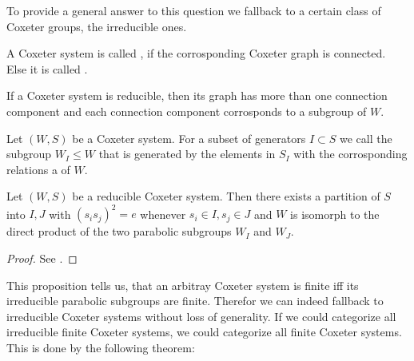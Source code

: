 To provide a general answer to this question we fallback to a certain class of Coxeter groups, the irreducible ones.

\begin{defi}
	\label{irreducible-coxeter-system}
	A Coxeter system is called , if the corrosponding Coxeter graph is connected. Else it is called .
\end{defi}

If a Coxeter system is reducible, then its graph has more than one connection component and each connection component corrosponds to a subgroup of $W$. 

\begin{defi}
	\label{parabolic-subgroup}
	Let $(W,S)$ be a Coxeter system. For a subset of generators $I \subset S$ we call the subgroup $W_I \leq W$ that is generated by the elements in $S_I$ with the corrosponding relations a  of $W$.
\end{defi}

\begin{prop}
	\label{reducible-coxeter-systems-isomorph-to-parabolic-subgroups}
	Let $(W,S)$ be a reducible Coxeter system. Then there exists a partition of $S$ into $I,J$ with $(s_i s_j)^2 = e$ whenever $s_i \in I, s_j \in J$ and $W$ is isomorph to the direct product of the two parabolic subgroups $W_I$ and $W_J$.

	\begin{proof}
		See \cite[Proposition 6.1]{humphreys:coxeter}.
	\end{proof}
\end{prop}

This proposition tells us, that an arbitray Coxeter system is finite iff its irreducible parabolic subgroups are finite. Therefor we can indeed fallback to irreducible Coxeter systems without loss of generality. If we could categorize all irreducible finite Coxeter systems, we could categorize all finite Coxeter systems. This is done by the following theorem:

